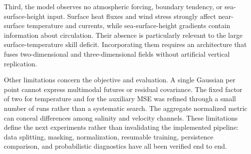 Third, the model observes no atmospheric forcing, boundary tendency, or sea-surface-height input. Surface heat fluxes and wind stress strongly affect near-surface temperature and currents, while sea-surface-height gradients contain information about circulation. Their absence is particularly relevant to the large surface-temperature skill deficit. Incorporating them requires an architecture that fuses two-dimensional and three-dimensional fields without artificial vertical replication.

Other limitations concern the objective and evaluation. A single Gaussian per point cannot express multimodal futures or residual covariance. The fixed factor of two for temperature and for the auxiliary MSE was refined through a small number of runs rather than a systematic search. The aggregate normalized metric can conceal differences among salinity and velocity channels. These limitations define the next experiments rather than invalidating the implemented pipeline: data splitting, masking, normalization, resumable training, persistence comparison, and probabilistic diagnostics have all been verified end to end.
